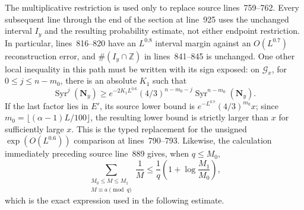 The multiplicative restriction is used only to replace source lines~759--762.
Every subsequent line through the end of the section at line~925 uses the
unchanged interval $I_y$ and the resulting probability estimate, not either
endpoint restriction.  In particular, lines~816--820 have an $L^{0.8}$
interval margin against an $O(L^{0.7})$ reconstruction error, and
$\#(I_y\cap\mathbb Z)$ in lines~841--845 is unchanged.  One other local
inequality in this path must be written with its sign exposed: on
$\mathcal G_x$, for $0\leq j\leq n-m_0$, there is an absolute $K_1$ such that
\[
 \operatorname{Syr}^{j}(\mathbf N_y)
 \geq e^{-2K_1L^{0.6}}(4/3)^{n-m_0-j}
       \operatorname{Syr}^{n-m_0}(\mathbf N_y).
\]
If the last factor lies in $E'$, its source lower bound is
$e^{-L^{0.7}}(4/3)^{m_0}x$; since
$m_0=\lfloor(\alpha-1)L/100\rfloor$, the resulting lower bound is strictly
larger than $x$ for sufficiently large $x$.  This is the typed replacement
for the unsigned $\exp(O(L^{0.6}))$ comparison at lines~790--793.  Likewise,
the calculation immediately preceding source line~889 gives, when $q\leq
M_0$,
\[
 \sum_{\substack{M_0\leq M\leq M_1\\M\equiv a\pmod q}}\frac1M
 \leq\frac1q\left(1+\log\frac{M_1}{M_0}\right),
\]
which is the exact expression used in the following estimate.


